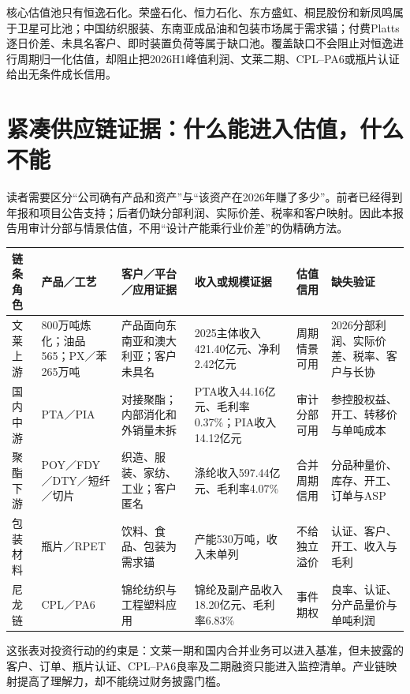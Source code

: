 核心估值池只有恒逸石化。荣盛石化、恒力石化、东方盛虹、桐昆股份和新凤鸣属于卫星可比池；中国纺织服装、东南亚成品油和包装市场属于需求锚；付费Platts逐日价差、未具名客户、即时装置负荷等属于缺口池。覆盖缺口不会阻止对恒逸进行周期归一化估值，却阻止把2026H1峰值利润、文莱二期、CPL--PA6或瓶片认证给出无条件成长信用。

\section{紧凑供应链证据：什么能进入估值，什么不能}

读者需要区分“公司确有产品和资产”与“该资产在2026年赚了多少”。前者已经得到年报和项目公告支持；后者仍缺分部利润、实际价差、税率和客户映射。因此本报告用审计分部与情景估值，不用“设计产能乘行业价差”的伪精确方法。

\begin{exhibitbox}[公司级链条证据与缺口]
\small
\noindent\begin{tabularx}{\textwidth}{L{2.1cm}L{2.2cm}L{2.45cm}L{2.65cm}L{2.15cm}X}
\toprule
\textbf{链条角色} & \textbf{产品／工艺} & \textbf{客户／平台／应用证据} & \textbf{收入或规模证据} & \textbf{估值信用} & \textbf{缺失验证} \\
\midrule
文莱上游 & 800万吨炼化；油品565；PX／苯265万吨 & 产品面向东南亚和澳大利亚；客户未具名 & 2025主体收入421.40亿元、净利2.42亿元 & 周期情景可用 & 2026分部利润、实际价差、税率、客户与长协 \\
国内中游 & PTA／PIA & 对接聚酯；内部消化和外销量未拆 & PTA收入44.16亿元、毛利率0.37\%；PIA收入14.12亿元 & 审计分部可用 & 参控股权益、开工、转移价与单吨成本 \\
聚酯下游 & POY／FDY／DTY／短纤／切片 & 织造、服装、家纺、工业；客户匿名 & 涤纶收入597.44亿元、毛利率4.07\% & 合并周期信用 & 分品种量价、库存、开工、订单与ASP \\
包装材料 & 瓶片／RPET & 饮料、食品、包装为需求锚 & 产能530万吨，收入未单列 & 不给独立溢价 & 认证、客户、开工、收入与毛利 \\
尼龙链 & CPL／PA6 & 锦纶纺织与工程塑料应用 & 锦纶及副产品收入18.20亿元、毛利率6.83\% & 事件期权 & 良率、认证、分产品量价与单吨利润 \\
\bottomrule
\end{tabularx}
\end{exhibitbox}

这张表对投资行动的约束是：文莱一期和国内合并业务可以进入基准，但未披露的客户、订单、瓶片认证、CPL--PA6良率及二期融资只能进入监控清单。产业链映射提高了理解力，却不能绕过财务披露门槛。

